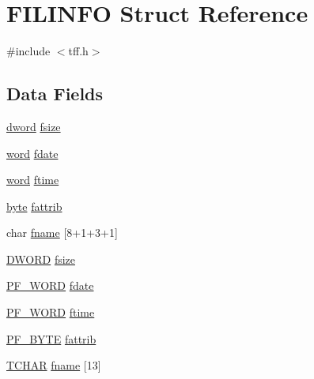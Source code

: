 \hypertarget{struct_f_i_l_i_n_f_o}{\section{F\-I\-L\-I\-N\-F\-O Struct Reference}
\label{struct_f_i_l_i_n_f_o}
}


{\ttfamily \#include $<$tff.\-h$>$}

\subsection*{Data Fields}
\begin{DoxyCompactItemize}
\item 
\hyperlink{p8_2pinguino_2core_2typedef_8h_a74cb93d430006e784da73b8ca406ee6e}{dword} \hyperlink{struct_f_i_l_i_n_f_o_a7582a0b3a658c0543f6cdc7585d84f7c}{fsize}
\item 
\hyperlink{p8_2pinguino_2core_2typedef_8h_abad51e07ab6d26bec9f1f786c8d65bcd}{word} \hyperlink{struct_f_i_l_i_n_f_o_a9478c5225c4f3a09d739dbc2245a72fd}{fdate}
\item 
\hyperlink{p8_2pinguino_2core_2typedef_8h_abad51e07ab6d26bec9f1f786c8d65bcd}{word} \hyperlink{struct_f_i_l_i_n_f_o_a3f6ad56d9c47d7ca879332e034917077}{ftime}
\item 
\hyperlink{p8_2pinguino_2core_2typedef_8h_a0c8186d9b9b7880309c27230bbb5e69d}{byte} \hyperlink{struct_f_i_l_i_n_f_o_af5fa689ce021720b227a97f69eb06dfe}{fattrib}
\item 
char \hyperlink{struct_f_i_l_i_n_f_o_a5a78da1cb66644bf00efc71578d7fbba}{fname} \mbox{[}8+1+3+1\mbox{]}
\item 
\hyperlink{p8_2pinguino_2libraries_2integer_8h_ad342ac907eb044443153a22f964bf0af}{D\-W\-O\-R\-D} \hyperlink{struct_f_i_l_i_n_f_o_af70a0afd16367837984d6205cbfca308}{fsize}
\item 
\hyperlink{p32_2include_2pinguino_2libraries_2sd_2integer_8h_a3f29df22680f9b74773a028915984992}{P\-F\-\_\-\-W\-O\-R\-D} \hyperlink{struct_f_i_l_i_n_f_o_a73ffadfea4b5bb0cc49c41c4e6203b2b}{fdate}
\item 
\hyperlink{p32_2include_2pinguino_2libraries_2sd_2integer_8h_a3f29df22680f9b74773a028915984992}{P\-F\-\_\-\-W\-O\-R\-D} \hyperlink{struct_f_i_l_i_n_f_o_abd08deb420662691dbaced4a4d729923}{ftime}
\item 
\hyperlink{p32_2include_2pinguino_2libraries_2sd_2integer_8h_aa1e36ce100a7ff1291e95b4515d42e65}{P\-F\-\_\-\-B\-Y\-T\-E} \hyperlink{struct_f_i_l_i_n_f_o_a5db0f68a162fff8361a03823cb0e5e75}{fattrib}
\item 
\hyperlink{ff_8h_a03bdb8ce5895c7e261aadc2529637546}{T\-C\-H\-A\-R} \hyperlink{struct_f_i_l_i_n_f_o_a7c33845207b44ca3b394052ad6724e72}{fname} \mbox{[}13\mbox{]}
\end{DoxyCompactItemize}


